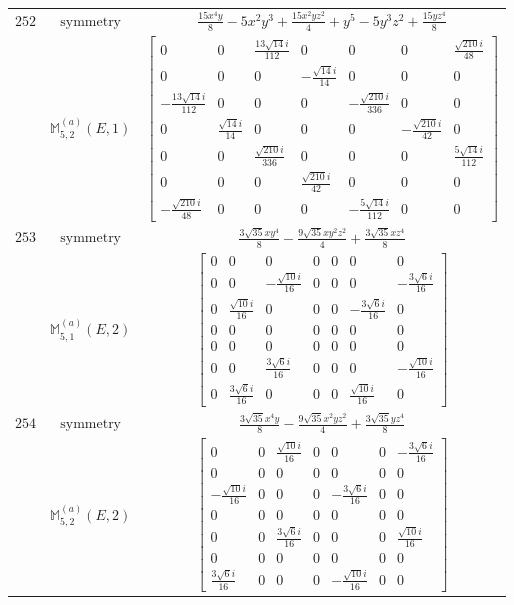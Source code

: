 \documentclass[fleqn,8pt,landscape]{jsarticle}
\begin{document}
\begin{longtable}{ccc}
$ 252 $ & $ \text{symmetry} $ & $ \frac{15 x^{4} y}{8} - 5 x^{2} y^{3} + \frac{15 x^{2} y z^{2}}{4} + y^{5} - 5 y^{3} z^{2} + \frac{15 y z^{4}}{8} $ \\
$  $ & $ \mathbb{M}_{5,2}^{(a)}(E,1) $ & $ \begin{bmatrix} 0 & 0 & \frac{13 \sqrt{14} i}{112} & 0 & 0 & 0 & \frac{\sqrt{210} i}{48} \\ 0 & 0 & 0 & - \frac{\sqrt{14} i}{14} & 0 & 0 & 0 \\ - \frac{13 \sqrt{14} i}{112} & 0 & 0 & 0 & - \frac{\sqrt{210} i}{336} & 0 & 0 \\ 0 & \frac{\sqrt{14} i}{14} & 0 & 0 & 0 & - \frac{\sqrt{210} i}{42} & 0 \\ 0 & 0 & \frac{\sqrt{210} i}{336} & 0 & 0 & 0 & \frac{5 \sqrt{14} i}{112} \\ 0 & 0 & 0 & \frac{\sqrt{210} i}{42} & 0 & 0 & 0 \\ - \frac{\sqrt{210} i}{48} & 0 & 0 & 0 & - \frac{5 \sqrt{14} i}{112} & 0 & 0 \end{bmatrix} $ \\ \hline
$ 253 $ & $ \text{symmetry} $ & $ \frac{3 \sqrt{35} x y^{4}}{8} - \frac{9 \sqrt{35} x y^{2} z^{2}}{4} + \frac{3 \sqrt{35} x z^{4}}{8} $ \\
$  $ & $ \mathbb{M}_{5,1}^{(a)}(E,2) $ & $ \begin{bmatrix} 0 & 0 & 0 & 0 & 0 & 0 & 0 \\ 0 & 0 & - \frac{\sqrt{10} i}{16} & 0 & 0 & 0 & - \frac{3 \sqrt{6} i}{16} \\ 0 & \frac{\sqrt{10} i}{16} & 0 & 0 & 0 & - \frac{3 \sqrt{6} i}{16} & 0 \\ 0 & 0 & 0 & 0 & 0 & 0 & 0 \\ 0 & 0 & 0 & 0 & 0 & 0 & 0 \\ 0 & 0 & \frac{3 \sqrt{6} i}{16} & 0 & 0 & 0 & - \frac{\sqrt{10} i}{16} \\ 0 & \frac{3 \sqrt{6} i}{16} & 0 & 0 & 0 & \frac{\sqrt{10} i}{16} & 0 \end{bmatrix} $ \\ \hline
$ 254 $ & $ \text{symmetry} $ & $ \frac{3 \sqrt{35} x^{4} y}{8} - \frac{9 \sqrt{35} x^{2} y z^{2}}{4} + \frac{3 \sqrt{35} y z^{4}}{8} $ \\
$  $ & $ \mathbb{M}_{5,2}^{(a)}(E,2) $ & $ \begin{bmatrix} 0 & 0 & \frac{\sqrt{10} i}{16} & 0 & 0 & 0 & - \frac{3 \sqrt{6} i}{16} \\ 0 & 0 & 0 & 0 & 0 & 0 & 0 \\ - \frac{\sqrt{10} i}{16} & 0 & 0 & 0 & - \frac{3 \sqrt{6} i}{16} & 0 & 0 \\ 0 & 0 & 0 & 0 & 0 & 0 & 0 \\ 0 & 0 & \frac{3 \sqrt{6} i}{16} & 0 & 0 & 0 & \frac{\sqrt{10} i}{16} \\ 0 & 0 & 0 & 0 & 0 & 0 & 0 \\ \frac{3 \sqrt{6} i}{16} & 0 & 0 & 0 & - \frac{\sqrt{10} i}{16} & 0 & 0 \end{bmatrix} $ \\ \hline

\end{longtable}
\end{document}
